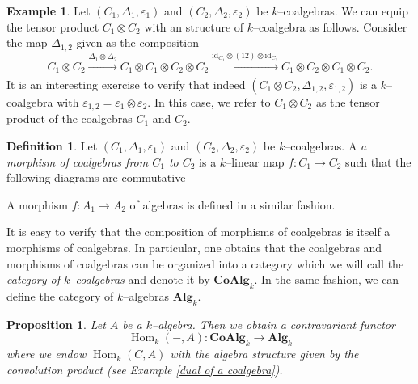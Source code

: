 \documentclass{article}
\theoremstyle{plain}
\newtheorem{Prop}[Th]{Proposition}
\theoremstyle{definition}
\newtheorem{Def}[Th]{Definition}
\newtheorem{Ex}[Th]{Example}
\DeclareMathOperator{\Hom}{Hom}
\begin{document}
\begin{Ex}\label{tensor coalgebra}
    Let $(C_1,\Delta_1,\varepsilon_1)$ and $(C_2,\Delta_2,\varepsilon_2)$ be $k$--coalgebras. We can equip the tensor product $C_1\otimes C_2$ with an structure of $k$--coalgebra as follows. Consider the map $\Delta_{1,2}$ given as the composition 
    \[
    C_1\otimes C_2 \xrightarrow[]{\Delta_1\otimes \Delta_2} C_1\otimes C_1\otimes C_2 \otimes C_2 \xrightarrow[]{\mathrm{id}_{C_1}\otimes (12)\otimes \mathrm{id}_{C_2}} C_1\otimes C_2 \otimes C_1\otimes C_2.
    \]
    It is an interesting exercise to verify that indeed $(C_1\otimes C_2,\Delta_{1,2},\varepsilon_{1,2})$ is a $k$--coalgebra with $\varepsilon_{1,2}=\varepsilon_1\otimes \varepsilon_2$. In this case, we refer to $C_1\otimes C_2$ as the tensor product of the coalgebras $C_1$ and $C_2$. 
\end{Ex}

\begin{Def}
    Let $(C_1,\Delta_1,\varepsilon_1)$ and $(C_2,\Delta_2,\varepsilon_2)$ be $k$--coalgebras. A \textit{a morphism of coalgebras from $C_1$ to $C_2$} is a $k$--linear map $f\colon C_1\to C_2$ such that the following diagrams are commutative 
    \begin{center}
    \end{center}
    A morphism $f\colon A_1\to A_2$ of algebras is defined in a similar fashion. 
\end{Def}

It is easy to verify that the composition of  morphisms of coalgebras is itself a morphisms of coalgebras. In particular, one obtains that the coalgebras and morphisms of coalgebras  can be organized into a category which we will call the \textit{category of $k$--coalgebras} and denote it by $\textbf{CoAlg}_k$. In the same fashion, we can define the category of $k$--algebras $\mathbf{Alg}_k$. 

\begin{Prop}
    Let $A$ be a $k$--algebra. Then we obtain a contravariant functor 
    \[
    \Hom_k(-,A)\colon \mathbf{CoAlg}_k\to \mathbf{Alg}_k
    \]
    where we endow $\Hom_k(C,A)$ with the algebra structure given by the convolution product (see Example \ref{dual of a coalgebra}). 
\end{Prop}
\end{document}
